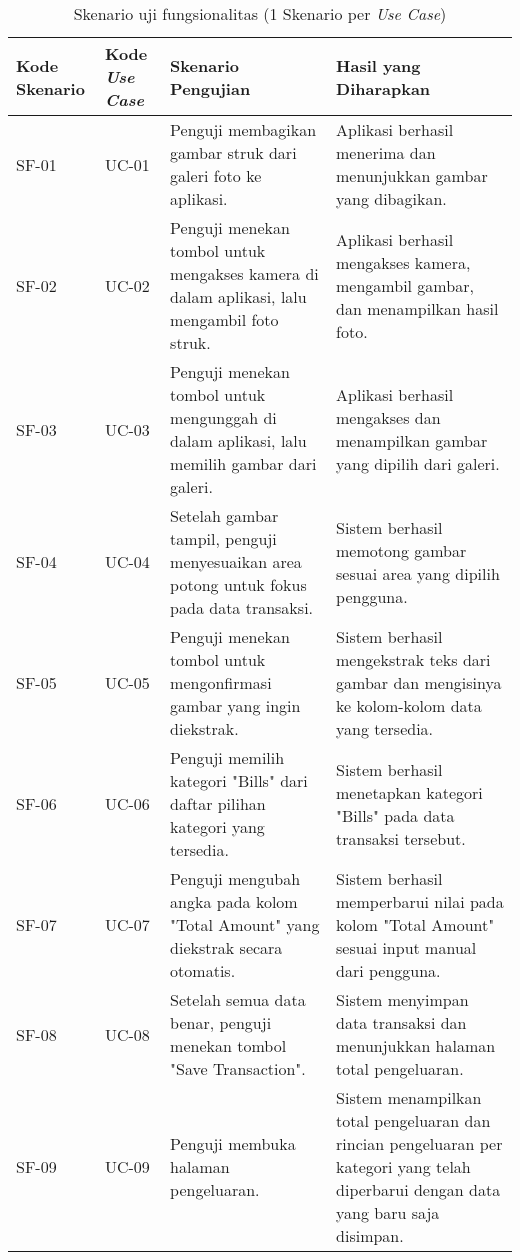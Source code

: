\begin{table}[h!]
\caption{Skenario uji fungsionalitas (1 Skenario per \emph{Use Case})}
\label{tab:skenario-uji-fungsional}
\begin{tabularx}{\linewidth}{|p{1.5cm}|p{1.5cm}|p{4.5cm}|X|}
\hline
\textbf{Kode Skenario} & \textbf{Kode \emph{Use Case}} & \textbf{Skenario Pengujian} & \textbf{Hasil yang Diharapkan} \\
\hline
SF-01 & UC-01 & Penguji membagikan gambar struk dari galeri foto ke aplikasi. & Aplikasi berhasil menerima dan menunjukkan gambar yang dibagikan. \\
\hline
SF-02 & UC-02 & Penguji menekan tombol untuk mengakses kamera di dalam aplikasi, lalu mengambil foto struk. & Aplikasi berhasil mengakses kamera, mengambil gambar, dan menampilkan hasil foto. \\
\hline
SF-03 & UC-03 & Penguji menekan tombol untuk mengunggah di dalam aplikasi, lalu memilih gambar dari galeri. & Aplikasi berhasil mengakses dan menampilkan gambar yang dipilih dari galeri. \\
\hline
SF-04 & UC-04 & Setelah gambar tampil, penguji menyesuaikan area potong untuk fokus pada data transaksi. & Sistem berhasil memotong gambar sesuai area yang dipilih pengguna. \\
\hline
SF-05 & UC-05 & Penguji menekan tombol untuk mengonfirmasi gambar yang ingin diekstrak. & Sistem berhasil mengekstrak teks dari gambar dan mengisinya ke kolom-kolom data yang tersedia. \\
\hline
SF-06 & UC-06 & Penguji memilih kategori "Bills" dari daftar pilihan kategori yang tersedia. & Sistem berhasil menetapkan kategori "Bills" pada data transaksi tersebut. \\
\hline
SF-07 & UC-07 & Penguji mengubah angka pada kolom "Total Amount" yang diekstrak secara otomatis. & Sistem berhasil memperbarui nilai pada kolom "Total Amount" sesuai input manual dari pengguna. \\
\hline
SF-08 & UC-08 & Setelah semua data benar, penguji menekan tombol "Save Transaction". & Sistem menyimpan data transaksi dan menunjukkan halaman total pengeluaran. \\
\hline
SF-09 & UC-09 & Penguji membuka halaman pengeluaran. & Sistem menampilkan total pengeluaran dan rincian pengeluaran per kategori yang telah diperbarui dengan data yang baru saja disimpan. \\
\hline
\end{tabularx}
\end{table}


